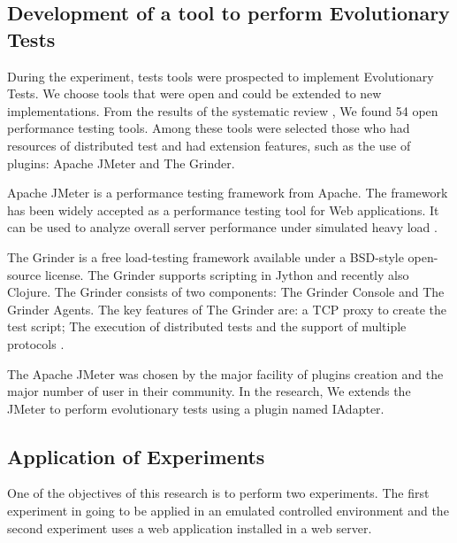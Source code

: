 \subsection{Development of a tool to perform Evolutionary Tests}

During the experiment, tests tools were prospected to implement Evolutionary Tests. We choose tools that were open and could be extended to new implementations. From the results of the systematic review , We found 54 open performance testing tools.  Among these tools were selected those who had resources of distributed test  and  had extension features, such as the use of plugins: Apache JMeter and  The Grinder.

Apache JMeter is a performance testing framework from Apache. The framework has been widely accepted as a performance testing tool for Web applications. It can be used to analyze overall server performance under simulated heavy load \cite{Nevedrov2007}.

The Grinder is a free load-testing framework available under a BSD-style open-source license.  The Grinder supports scripting in Jython and recently also Clojure. The Grinder consists of two components: The Grinder Console  and The Grinder Agents. The key features of The Grinder are: a TCP proxy to create the test script; The execution of distributed tests and the support of multiple protocols \cite{Wang2010} \cite{Smeral2014}. 
 

The Apache JMeter was chosen by the major facility of plugins creation and the major number of user in their community. In the research, We extends the JMeter to perform evolutionary  tests using a plugin named IAdapter.

\subsection{Application of Experiments}

One of the objectives of this research is to perform two experiments. The first experiment in going to be applied in an emulated controlled environment and the second experiment uses a web application installed  in a web server.